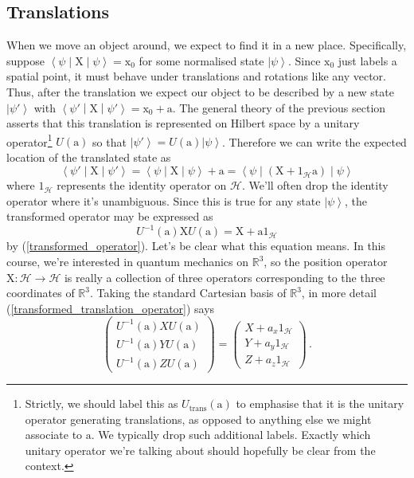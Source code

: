 \documentclass{article}
\theoremstyle{plain}\theoremheaderfont{\normalfont\itshape}\theorembodyfont{\rmfamily}\theoremseparator{.}\newtheorem*{rem}{Remark}\newtheorem*{ex}{Example}\newtheorem*{proof}{Proof}\newtheorem*{altp}{Alternative proof}
\theoremstyle{plain}\theoremheaderfont{\normalfont\bfseries}\theorembodyfont{\rmfamily}\theoremseparator{.}\newtheorem{thm}{Theorem}[section]\newtheorem{lem}[thm]{Lemma}\newtheorem{prop}[thm]{Proposition}\newtheorem*{cor}{Corollary}\newtheorem{defn}[thm]{Definition}\newtheorem{clm}[thm]{Claim}\newtheorem{clminproof}{Claim}
\theoremstyle{break}\theoremheaderfont{\normalfont\itshape}\theorembodyfont{\rmfamily}\theoremseparator{.\medskip}\newtheorem*{proofskip}{Proof}\newtheorem*{exs}{Examples}\newtheorem*{rems}{Remarks}
\theoremstyle{break}\theoremheaderfont{\normalfont\bfseries}\theorembodyfont{\rmfamily}\theoremseparator{.\medskip}\newtheorem{lemskip}[thm]{Lemma}\newtheorem{defnskip}[thm]{Definition}\newtheorem{propskip}[thm]{Proposition}\newtheorem{thmskip}[thm]{Theorem}
\numberwithin{equation}{section}
\newcommand{\ket}[1]{\left| #1 \right\rangle}
\newcommand{\expval}[2]{\left\langle #2 \middle| #1 \middle| #2 \right\rangle}
\newcommand{\vb}[1]{\bm{\mathrm{#1}}}
\newcommand{\hb}{\mathcal{H}}
\newcommand{\RR}{\mathbb{R}}
\begin{document}
    \subsection{Translations}
    When we move an object around, we expect to find it in a new place. Specifically, suppose \(\expval{\vb{X}}{\psi}=\vb{x}_0\) for some normalised state \(\ket{\psi}\). Since \(\vb{x}_0\) just labels a spatial point, it must behave under translations and rotations like any vector. Thus, after the translation we expect our object to be described by a new state \(\ket{\psi'}\) with \(\expval{\vb{X}}{\psi'}=\vb{x}_0+\vb{a}\). The general theory of the previous section asserts that this translation is represented on Hilbert space by a unitary operator\footnote{Strictly, we should label this as \(U_\text{trans}(\vb{a})\) to emphasise that it is the unitary operator generating translations, as opposed to anything else we might associate to \(\vb{a}\). We typically drop such additional labels. Exactly which unitary operator we're talking about should hopefully be clear from the context.} \(U(\vb{a})\) so that \(\ket{\psi'}=U(\vb{a})\ket{\psi}\). Therefore we can write the expected location of the translated state as
    \begin{equation}
        \expval{\vb{X}}{\psi'}=\expval{\vb{X}}{\psi}+\vb{a}=\expval{(\vb{X}+1_\hb\vb{a})}{\psi}
    \end{equation}
    where \(1_\hb\) represents the identity operator on \(\hb\). We'll often drop the identity operator where it's unambiguous. Since this is true for any state \(\ket{\psi}\), the transformed operator may be expressed as
    \begin{equation}\label{transformed_translation_operator}
        U^{-1}(\vb{a})\vb{X}U(\vb{a})=\vb{X}+\vb{a}1_\hb
    \end{equation}
    by (\ref{transformed_operator}). Let's be clear what this equation means. In this course, we're interested in quantum mechanics on \(\RR^3\), so the position operator \(\vb{X}:\hb\to\hb\) is really a collection of three operators corresponding to the three coordinates of \(\RR^3\). Taking the standard Cartesian basis of \(\RR^3\), in more detail (\ref{transformed_translation_operator}) says
    \begin{equation}
        \begin{pmatrix}
        U^{-1}(\vb{a})XU(\vb{a})\\
        U^{-1}(\vb{a})YU(\vb{a})\\
        U^{-1}(\vb{a})ZU(\vb{a})
    \end{pmatrix}=\begin{pmatrix}
        X+a_x1_\hb\\
        Y+a_y1_\hb\\
        Z+a_z1_\hb
    \end{pmatrix}\,.
    \end{equation}
\end{document}
